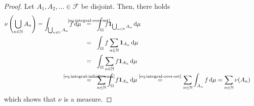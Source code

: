 \begin{proof}
Let $A_1,A_2,\ldots \in \mathcal{F}$ be disjoint.
Then, there holds
\[
\begin{aligned}
\nu\left(\bigcup_{n \in \N} A_n\right)
=
\int_{\bigcup_{n\in\N}A_n} f\,\dif\mu 
&\overset{\text{\makebox[\widthof{(5.10)}][c]{\eqref{eq:integral-over-set}}}}{=}
\int_{\Omega} f\ind_{\bigcup_{n\in\N}A_n}\,\dif\mu \\
&\overset{\text{\makebox[\widthof{(5.10)}][c]{}}}{=}
\int_{\Omega} f\sum_{n\in\N}\ind_{A_n}\,\dif\mu \\
&\overset{\text{\makebox[\widthof{(5.10)}][c]{}}}{=}
\int_{\Omega} \sum_{n\in\N} f \ind_{A_n}\,\dif\mu \\
&\overset{\text{\makebox[\widthof{(5.10)}][c]{\eqref{eq:integral-infinite-sum}}}}{=}
\sum_{n\in\N}\int_{\Omega} f\ind_{A_n}\,\dif\mu 
\overset{\text{\eqref{eq:integral-over-set}}}{=}
\sum_{n\in\N}\int_{A_n} f\,\dif\mu
=
\sum_{n\in\N}\nu(A_n)
\end{aligned}
\]
which shows that $\nu$ is a measure.


\end{proof}
